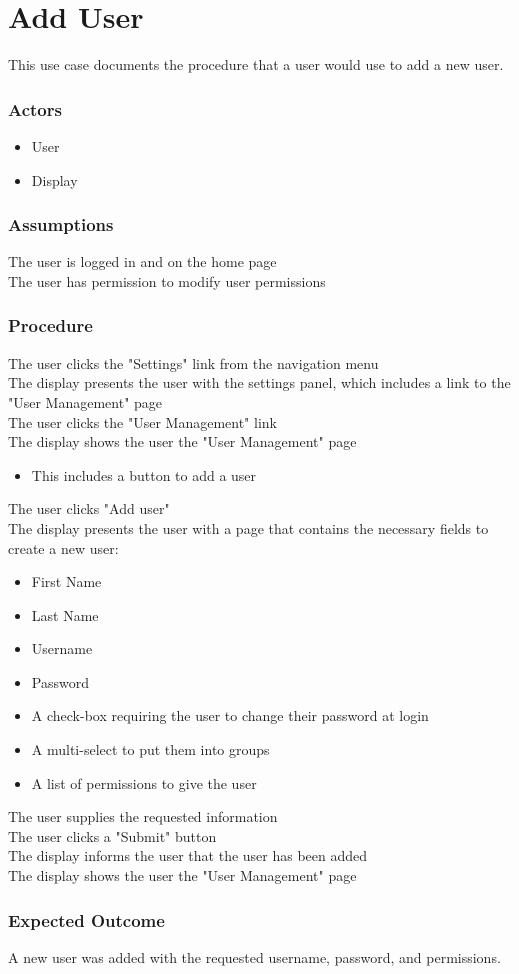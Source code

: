 \section{Add User}

This use case documents the procedure that a user would use to add a new user.

\subsubsection{Actors}
\begin{itemize}
	\item User
	\item Display
\end{itemize}

\subsubsection{Assumptions}

The user is logged in and on the home page\\
The user has permission to modify user permissions

\subsubsection{Procedure}

The user clicks the "Settings" link from the navigation menu\\
The display presents the user with the settings panel, which includes a link to the "User Management" page\\
The user clicks the "User Management" link\\
The display shows the user the "User Management" page
\begin{itemize}
	\item This includes a button to add a user 
\end{itemize}
The user clicks "Add user"\\
The display presents the user with a page that contains the necessary fields to create a new user:
\begin{itemize}
	\item First Name
	\item Last Name
	\item Username
	\item Password
	\item A check-box requiring the user to change their password at login
	\item A multi-select to put them into groups
	\item A list of permissions to give the user 
\end{itemize}
The user supplies the requested information\\
The user clicks a "Submit" button \\
The display informs the user that the user has been added\\
The display shows the user the "User Management" page

\subsubsection{Expected Outcome}

A new user was added with the requested username, password, and permissions.